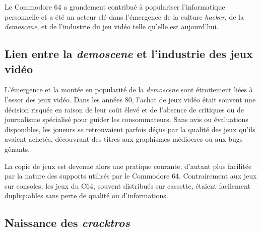 Le Commodore 64 a grandement contribué à populariser l'informatique personnelle et a été un acteur clé dans l'émergence de la culture \textit{hacker}, de la \textit{demoscene}, et de l'industrie du jeu vidéo telle qu'elle est aujourd'hui.

\subsection*{Lien entre la \textit{demoscene} et l'industrie des jeux vidéo}

L'émergence et la montée en popularité de la \textit{demoscene} sont étroitement liées à l'essor des jeux vidéo. Dans les années 80, l'achat de jeux vidéo était souvent une décision risquée en raison de leur coût élevé et de l'absence de critiques ou de journalisme spécialisé pour guider les consommateurs. Sans avis ou évaluations disponibles, les joueurs se retrouvaient parfois déçus par la qualité des jeux qu'ils avaient achetés, découvrant des titres aux graphismes médiocres ou aux bugs gênants.




La copie de jeux est devenue alors une pratique courante, d'autant plus facilitée par la nature des supports utilisés par le Commodore 64. Contrairement aux jeux sur consoles, les jeux du C64, souvent distribués sur cassette, étaient facilement dupliquables sans perte de qualité ou d'informations.

\subsection*{Naissance des \textit{cracktros}}

